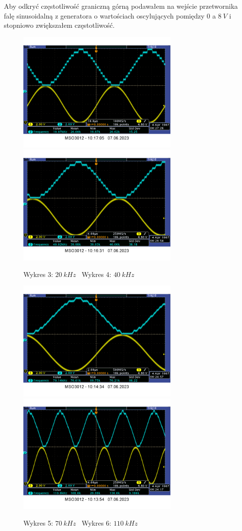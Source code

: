 \documentclass[14pt, table]{extarticle}
\begin{document}
Aby odkryć częstotliwość graniczną górną podawałem na wejście przetwornika falę sinusoidalną z generatora o wartościach oscylujących pomiędzy $0$ a $8 \ V$ i stopniowo zwiększałem częstotliwość.

\begin{figure}[H]
\includegraphics[width=8cm]{A7}
\includegraphics[width=8cm]{A6}
\centering
\captionsetup{labelformat=empty}
\caption{Wykres 3: $20 \ kHz$ \ Wykres 4: $40 \ kHz$}
\end{figure}

\begin{figure}[H]
\includegraphics[width=8cm]{A5}
\includegraphics[width=8cm]{A4}
\centering
\captionsetup{labelformat=empty}
\caption{Wykres 5: $70 \ kHz$ \ Wykres 6: $110 \ kHz$}
\end{figure}
\end{document}

